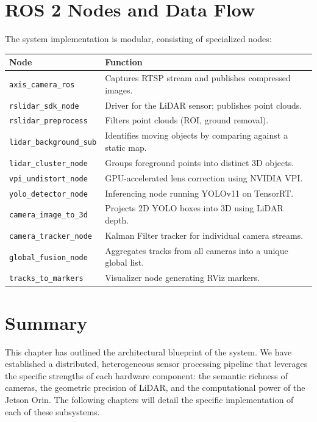 \documentclass[12pt,a4paper]{report}
\begin{document}
\section{ROS 2 Nodes and Data Flow}
The system implementation is modular, consisting of specialized nodes:
\begin{longtable}{@{}p{}p{}@{}}
\toprule
\textbf{Node} & \textbf{Function} \\
\midrule
\texttt{axis\_camera\_ros} & Captures RTSP stream and publishes compressed images. \\
\texttt{rslidar\_sdk\_node} & Driver for the LiDAR sensor; publishes point clouds. \\
\texttt{rslidar\_preprocess} & Filters point clouds (ROI, ground removal). \\
\texttt{lidar\_background\_sub} & Identifies moving objects by comparing against a static map. \\
\texttt{lidar\_cluster\_node} & Groups foreground points into distinct 3D objects. \\
\texttt{vpi\_undistort\_node} & GPU-accelerated lens correction using NVIDIA VPI. \\
\texttt{yolo\_detector\_node} & Inferencing node running YOLOv11 on TensorRT. \\
\texttt{camera\_image\_to\_3d} & Projects 2D YOLO boxes into 3D using LiDAR depth. \\
\texttt{camera\_tracker\_node} & Kalman Filter tracker for individual camera streams. \\
\texttt{global\_fusion\_node} & Aggregates tracks from all cameras into a unique global list. \\
\texttt{tracks\_to\_markers} & Visualizer node generating RViz markers. \\
\bottomrule
\end{longtable}

\section{Summary}
This chapter has outlined the architectural blueprint of the system. We have established a distributed, heterogeneous sensor processing pipeline that leverages the specific strengths of each hardware component: the semantic richness of cameras, the geometric precision of LiDAR, and the computational power of the Jetson Orin. The following chapters will detail the specific implementation of each of these subsystems.

\end{document}
